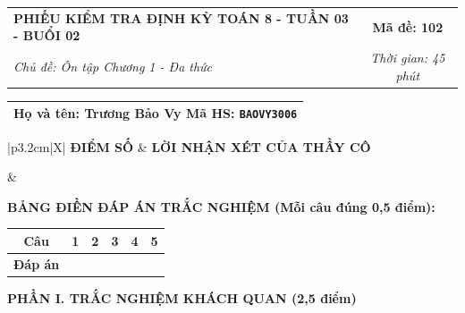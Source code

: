 \documentclass[12pt,a4paper]{article}
\begin{document}
\newpage


\noindent
\begin{tabularx}{\linewidth}{|X|c|}
\hline
\textbf{PHIẾU KIỂM TRA ĐỊNH KỲ TOÁN 8 - TUẦN 03 - BUỔI 02} & \textbf{Mã đề: 102} \\
\textit{Chủ đề: Ôn tập Chương 1 - Đa thức} & \textit{Thời gian: 45 phút} \\
\hline
\end{tabularx}

\vspace{1mm}

\noindent
\begin{tabularx}{\linewidth}{|X|}
\hline
\rule[-2mm]{0pt}{7.5mm}\textbf{Họ và tên:} \textbf{\large Trương Bảo Vy} \hfill \textbf{Mã HS:} \texttt{BAOVY3006} \quad \\
\hline
\end{tabularx}

\vspace{1mm}

\noindent
\begin{tabularx}{\linewidth}{|p{3.2cm}|X|}
\hline
\centering\textbf{ĐIỂM SỐ} & \centering\textbf{LỜI NHẬN XÉT CỦA THẦY CÔ} \tabularnewline
\hline
\rule{0pt}{1.3cm} & \tabularnewline
\hline
\end{tabularx}

\vspace{1.2mm}

\noindent\textbf{BẢNG ĐIỀN ĐÁP ÁN TRẮC NGHIỆM (Mỗi câu đúng 0,5 điểm):}
\vspace{0.8mm}

\noindent
\renewcommand{\arraystretch}{1.35}
\begin{tabularx}{\linewidth}{|c|*{5}{>{\centering\arraybackslash}X|}}
\hline
\textbf{Câu} & \textbf{1} & \textbf{2} & \textbf{3} & \textbf{4} & \textbf{5} \\
\hline
\textbf{Đáp án} & & & & & \\
\hline
\end{tabularx}
\renewcommand{\arraystretch}{1.0}

\vspace{1.5mm}

\noindent\textbf{\large PHẦN I. TRẮC NGHIỆM KHÁCH QUAN (2,5 điểm)}
\vspace{1mm}
\end{document}
